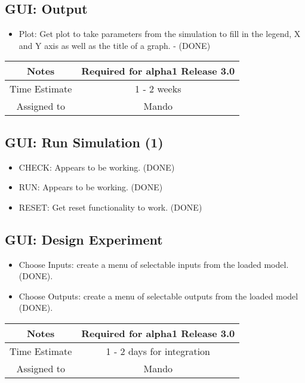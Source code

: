 \documentclass[12pt]{article}
\begin{document}
\subsection{GUI: Output}
\begin{itemize}
\item Plot: Get plot to take parameters from the simulation to fill in
  the legend, X and Y axis as well as the title of a graph. - (DONE)
\end{itemize}

{
  \vspace{5mm}
  \centering
  \begin{tabular}{|c|c|}
    \hline
    Notes
    & Required for alpha1 Release 3.0 \\
    \hline
    Time Estimate
    & 1 - 2 weeks \\
    \hline
    Assigned to
    & Mando \\
    \hline
  \end{tabular}
}


\subsection{GUI: Run Simulation (1)}
\begin{itemize}
\item CHECK: Appears to be working. (DONE)
\item RUN: Appears to be working. (DONE)      
\item RESET: Get reset functionality to work. (DONE)
\end{itemize}


\subsection{GUI: Design Experiment}
\begin{itemize}
\item Choose Inputs: create a menu of selectable inputs from the
  loaded model. (DONE).
\item Choose Outputs: create a menu of selectable outputs from the
  loaded model (DONE).
\end{itemize}

{
  \vspace{5mm}
  \centering
  \begin{tabular}{|c|c|}
    \hline
    Notes
    & Required for alpha1 Release 3.0 \\
    \hline
    Time Estimate
    & 1 - 2 days for integration \\
    \hline
    Assigned to
    & Mando \\
    \hline
  \end{tabular}
}
\end{document}
